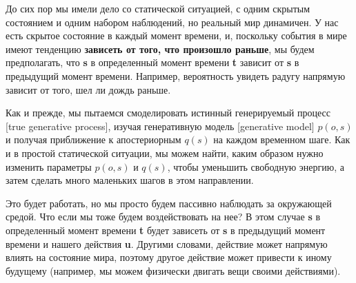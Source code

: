\documentclass[twoside,leqno, 11pt]{article}
\begin{document}
	До сих пор мы имели дело со статической ситуацией, с одним скрытым состоянием и одним набором наблюдений, но реальный мир динамичен. У нас есть скрытое состояние в каждый момент времени, и, поскольку события в мире имеют тенденцию \textbf{зависеть от того, что произошло раньше}, мы будем предполагать, что \textbf{s} в определенный момент времени \textbf{t} зависит от \textbf{s} в предыдущий момент времени. Например, вероятность увидеть радугу напрямую зависит от того, шел ли дождь раньше.
	
	\begin{figure}[h]	
		\label{ris:image}
	\end{figure}
	
	Как и прежде, мы пытаемся смоделировать истинный генерируемый процесс [true generative process], изучая генеративную модель [generative model] $p(o,s)$ и получая приближение к апостериорным $q(s)$ на каждом временном шаге. Как и в простой статической ситуации, мы можем найти, каким образом нужно изменить параметры $p(o,s)$ и $q(s)$, чтобы уменьшить свободную энергию, а затем сделать много маленьких шагов в этом направлении.

	\begin{figure}[h]	
		\label{ris:image}
	\end{figure}
	
	Это будет работать, но мы просто будем пассивно наблюдать за окружающей средой. Что если мы тоже будем воздействовать на нее? В этом случае \textbf{s} в определенный момент времени \textbf{t} будет зависеть от \textbf{s} в предыдущий момент времени и нашего действия \textbf{u}. Другими словами, действие может напрямую влиять на состояние мира, поэтому другое действие может привести к иному будущему (например, мы можем физически двигать вещи своими действиями).
\end{document}
